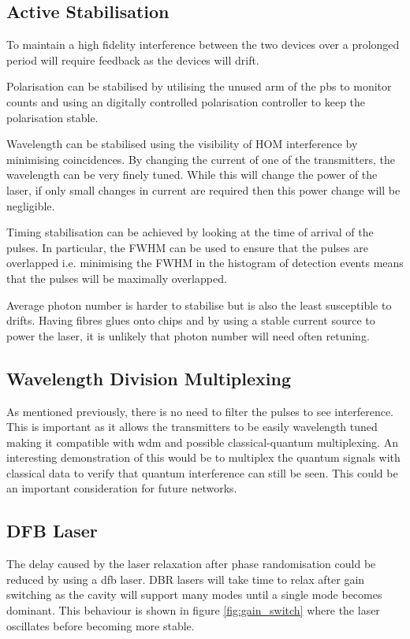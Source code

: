\subsection{Active Stabilisation}

To maintain a high fidelity interference between the two devices over a prolonged period will require feedback as the devices will drift. 

Polarisation can be stabilised by utilising the unused arm of the \ac{pbs} to monitor counts and using an digitally controlled polarisation controller to keep the polarisation stable.

Wavelength can be stabilised using the visibility of \ac{HOM} interference by minimising coincidences. By changing the current of one of the transmitters, the wavelength can be very finely tuned. While this will change the power of the laser, if only small changes in current are required then this power change will be negligible.

Timing stabilisation can be achieved by looking at the time of arrival of the pulses. In particular, the \ac{FWHM} can be used to ensure that the pulses are overlapped i.e. minimising the \ac{FWHM} in the histogram of detection events means that the pulses will be maximally overlapped.

Average photon number is harder to stabilise but is also the least susceptible to drifts. Having fibres glues onto chips and by using a stable current source to power the laser, it is unlikely that photon number will need often retuning.

\subsection{Wavelength Division Multiplexing}

As mentioned previously, there is no need to filter the pulses to see interference. This is important as it allows the transmitters to be easily wavelength tuned making it compatible with \ac{wdm} and possible classical-quantum multiplexing. An interesting demonstration of this would be to multiplex the quantum signals with classical data to verify that quantum interference can still be seen. This could be an important consideration for future networks.

\subsection{DFB Laser}

The delay caused by the laser relaxation after phase randomisation could be reduced by using a \ac{dfb} laser. \ac{DBR} lasers will take time to relax after gain switching as the cavity will support many modes until a single mode becomes dominant. This behaviour is shown in figure \ref{fig:gain_switch} where the laser oscillates before becoming more stable. 

